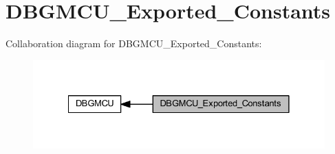 \hypertarget{group___d_b_g_m_c_u___exported___constants}{}\section{D\+B\+G\+M\+C\+U\+\_\+\+Exported\+\_\+\+Constants}
\label{group___d_b_g_m_c_u___exported___constants}
Collaboration diagram for D\+B\+G\+M\+C\+U\+\_\+\+Exported\+\_\+\+Constants\+:
\nopagebreak
\begin{figure}[H]
\begin{center}
\leavevmode
\includegraphics[width=328pt]{group___d_b_g_m_c_u___exported___constants}
\end{center}
\end{figure}
